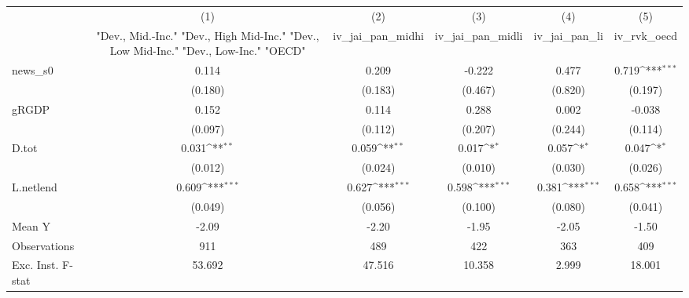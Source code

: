 {
\def\sym#1{\ifmmode^{#1}\else\(^{#1}\)\fi}
\begin{tabular}{l*{5}{c}}
\toprule
            &\multicolumn{1}{c}{(1)}&\multicolumn{1}{c}{(2)}&\multicolumn{1}{c}{(3)}&\multicolumn{1}{c}{(4)}&\multicolumn{1}{c}{(5)}\\
            &\multicolumn{1}{c}{ "Dev., Mid.-Inc." "Dev., High Mid-Inc." "Dev., Low Mid-Inc." "Dev., Low-Inc." "OECD" }&\multicolumn{1}{c}{iv\_jai\_pan\_midhi}&\multicolumn{1}{c}{iv\_jai\_pan\_midli}&\multicolumn{1}{c}{iv\_jai\_pan\_li}&\multicolumn{1}{c}{iv\_rvk\_oecd}\\
\midrule
news\_s0     &       0.114         &       0.209         &      -0.222         &       0.477         &       0.719\sym{***}\\
            &     (0.180)         &     (0.183)         &     (0.467)         &     (0.820)         &     (0.197)         \\
\addlinespace
gRGDP       &       0.152         &       0.114         &       0.288         &       0.002         &      -0.038         \\
            &     (0.097)         &     (0.112)         &     (0.207)         &     (0.244)         &     (0.114)         \\
\addlinespace
D.tot       &       0.031\sym{**} &       0.059\sym{**} &       0.017\sym{*}  &       0.057\sym{*}  &       0.047\sym{*}  \\
            &     (0.012)         &     (0.024)         &     (0.010)         &     (0.030)         &     (0.026)         \\
\addlinespace
L.netlend   &       0.609\sym{***}&       0.627\sym{***}&       0.598\sym{***}&       0.381\sym{***}&       0.658\sym{***}\\
            &     (0.049)         &     (0.056)         &     (0.100)         &     (0.080)         &     (0.041)         \\
\midrule
Mean Y      &       -2.09         &       -2.20         &       -1.95         &       -2.05         &       -1.50         \\
Observations&         911         &         489         &         422         &         363         &         409         \\
Exc. Inst. F-stat&      53.692         &      47.516         &      10.358         &       2.999         &      18.001         \\
\bottomrule
\end{tabular}
}
